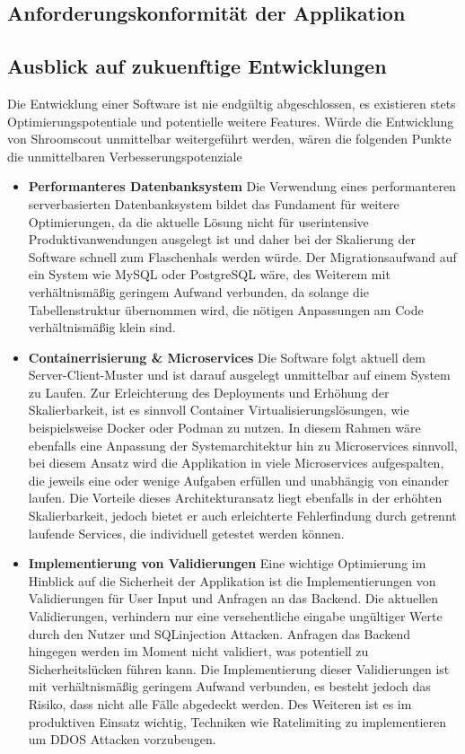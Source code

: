 \documentclass[../main.tex]{subfiles}
\begin{document}
\subsection{Anforderungskonformität der Applikation}
\subsection{Ausblick auf zukuenftige Entwicklungen}
Die Entwicklung einer Software ist nie endgültig abgeschlossen, es existieren stets Optimierungspotentiale und potentielle weitere Features.
Würde die Entwicklung von Shroomscout unmittelbar weitergeführt werden, wären die folgenden Punkte die unmittelbaren Verbesserungspotenziale

\begin{itemize}

    \item \textbf{Performanteres Datenbanksystem}
        Die Verwendung eines performanteren serverbasierten Datenbanksystem bildet das Fundament für weitere Optimierungen, da die aktuelle Lösung nicht für userintensive
        Produktivanwendungen ausgelegt ist und daher bei der Skalierung der Software schnell zum Flaschenhals werden würde. Der Migrationsaufwand auf ein System wie MySQL oder PostgreSQL
        wäre, des Weiterem mit verhältnismäßig geringem Aufwand verbunden, da solange die Tabellenstruktur übernommen wird, die nötigen Anpassungen am Code verhältnismäßig klein sind. 

	\item \textbf{Containerrisierung \& Microservices}
	    Die Software folgt aktuell dem Server-Client-Muster und ist darauf ausgelegt unmittelbar auf einem System zu Laufen.
        Zur Erleichterung des Deployments und Erhöhung der Skalierbarkeit, ist es sinnvoll Container Virtualisierungslösungen, wie beispielsweise Docker oder Podman zu nutzen.
        In diesem Rahmen wäre ebenfalls eine Anpassung der Systemarchitektur hin zu Microservices sinnvoll, bei diesem Ansatz wird die Applikation in viele Microservices aufgespalten,
        die jeweils eine oder wenige Aufgaben erfüllen und unabhängig von einander laufen. Die Vorteile dieses Architekturansatz liegt ebenfalls in der erhöhten Skalierbarkeit, jedoch
        bietet er auch erleichterte Fehlerfindung durch getrennt laufende Services, die individuell getestet werden können.
        
    \item \textbf{Implementierung von Validierungen}
        Eine wichtige Optimierung im Hinblick auf die Sicherheit der Applikation ist die Implementierungen von Validierungen für User Input und Anfragen an das Backend.
        Die aktuellen Validierungen, verhindern nur eine versehentliche eingabe ungültiger Werte durch den Nutzer und SQLinjection Attacken. Anfragen das Backend hingegen werden
        im Moment nicht validiert, was potentiell zu Sicherheitslücken führen kann. Die Implementierung dieser Validierungen ist mit verhältnismäßig geringem Aufwand verbunden,
        es besteht jedoch das Risiko, dass nicht alle Fälle abgedeckt werden. Des Weiteren ist es im produktiven Einsatz wichtig, Techniken wie Ratelimiting zu implementieren um 
        DDOS Attacken vorzubeugen.
        

\end{itemize}
\end{document}
